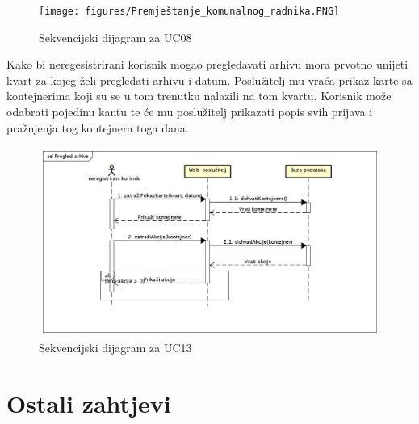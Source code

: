 				\begin{figure}[H]
					\texttt{[image: figures/Premještanje\_komunalnog\_radnika.PNG]}
					\centering
					\caption{Sekvencijski dijagram za UC08}
					\label{fig:sekv-uc08}
				\end{figure}

				
				
				Kako bi neregesistrirani korisnik mogao pregledavati arhivu mora prvotno unijeti kvart za kojeg želi pregledati arhivu i datum. Poslužitelj mu vraća prikaz karte sa kontejnerima koji su se u tom trenutku nalazili na tom kvartu. Korisnik može odabrati pojedinu kantu te će mu poslužitelj prikazati popis svih prijava i pražnjenja tog kontejnera toga dana. \\
				
				\begin{figure}[H]
					\includegraphics[scale=0.5]{figures/Pregled_arhive.PNG}
					\centering
					\caption{Sekvencijski dijagram za UC13}
					\label{fig:sekv-uc13}
				\end{figure}

				
				
				\eject
	
	
	
		\section{Ostali zahtjevi}\
		
